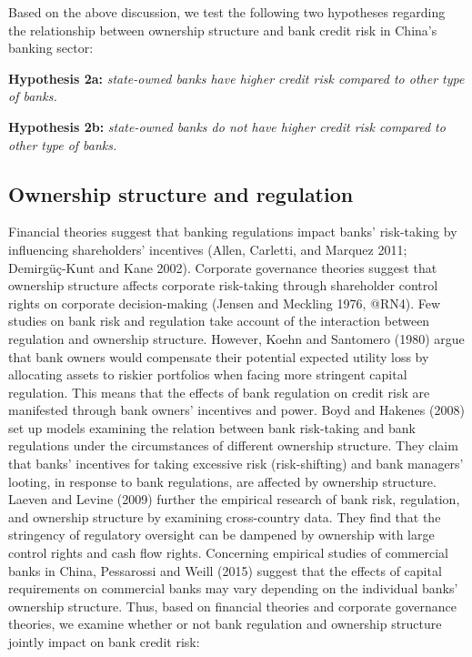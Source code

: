 \documentclass{article}
\begin{document}
Based on the above discussion, we test the following two hypotheses
regarding the relationship between ownership structure and bank credit
risk in China's banking sector:

\textbf{Hypothesis 2a:} \emph{state-owned banks have higher credit risk
compared to other type of banks.}

\textbf{Hypothesis 2b:} \emph{state-owned banks do not have higher
credit risk compared to other type of banks.}

\hypertarget{ownership-structure-and-regulation}{%
\subsection{Ownership structure and
regulation}\label{ownership-structure-and-regulation}}

Financial theories suggest that banking regulations impact banks'
risk-taking by influencing shareholders' incentives (Allen, Carletti,
and Marquez 2011; Demirgüç-Kunt and Kane 2002). Corporate governance
theories suggest that ownership structure affects corporate risk-taking
through shareholder control rights on corporate decision-making (Jensen
and Meckling 1976, @RN4). Few studies on bank risk and regulation take
account of the interaction between regulation and ownership structure.
However, Koehn and Santomero (1980) argue that bank owners would
compensate their potential expected utility loss by allocating assets to
riskier portfolios when facing more stringent capital regulation. This
means that the effects of bank regulation on credit risk are manifested
through bank owners' incentives and power. Boyd and Hakenes (2008) set
up models examining the relation between bank risk-taking and bank
regulations under the circumstances of different ownership structure.
They claim that banks' incentives for taking excessive risk
(risk-shifting) and bank managers' looting, in response to bank
regulations, are affected by ownership structure. Laeven and Levine
(2009) further the empirical research of bank risk, regulation, and
ownership structure by examining cross-country data. They find that the
stringency of regulatory oversight can be dampened by ownership with
large control rights and cash flow rights. Concerning empirical studies
of commercial banks in China, Pessarossi and Weill (2015) suggest that
the effects of capital requirements on commercial banks may vary
depending on the individual banks' ownership structure. Thus, based on
financial theories and corporate governance theories, we examine whether
or not bank regulation and ownership structure jointly impact on bank
credit risk:
\end{document}
